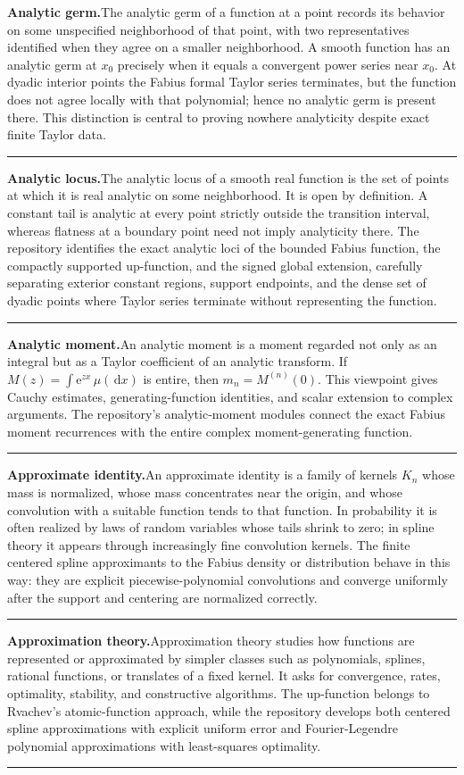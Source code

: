 \documentclass[11pt,oneside]{article}
\newcommand{\e}{\mathrm e}
\newcommand{\dd}{\,\mathrm d}
\newcommand{\glossaryentry}[3]{%
  \par\addvspace{0.95\baselineskip}%
  \phantomsection\hypertarget{gls:#1}{}%
  \noindent\textbf{\large #2.}\enspace #3\par
  \nopagebreak[2]\vspace{0.15\baselineskip}%
  \noindent\color{rulegray}\rule{\linewidth}{0.25pt}\color{black}%
}
\begin{document}
\glossaryentry{analytic-germ}{Analytic germ}{The analytic germ of a function at a point records its behavior on some unspecified neighborhood of that point, with two representatives identified when they agree on a smaller neighborhood. A smooth function has an analytic germ at \(x_0\) precisely when it equals a convergent power series near \(x_0\). At dyadic interior points the Fabius formal Taylor series terminates, but the function does not agree locally with that polynomial; hence no analytic germ is present there. This distinction is central to proving nowhere analyticity despite exact finite Taylor data.}
\glossaryentry{analytic-locus}{Analytic locus}{The analytic locus of a smooth real function is the set of points at which it is real analytic on some neighborhood. It is open by definition. A constant tail is analytic at every point strictly outside the transition interval, whereas flatness at a boundary point need not imply analyticity there. The repository identifies the exact analytic loci of the bounded Fabius function, the compactly supported up-function, and the signed global extension, carefully separating exterior constant regions, support endpoints, and the dense set of dyadic points where Taylor series terminate without representing the function.}
\glossaryentry{analytic-moment}{Analytic moment}{An analytic moment is a moment regarded not only as an integral but as a Taylor coefficient of an analytic transform. If \(M(z)=\int\e^{zx}\,\mu(\dd x)\) is entire, then \(m_n=M^{(n)}(0)\). This viewpoint gives Cauchy estimates, generating-function identities, and scalar extension to complex arguments. The repository's analytic-moment modules connect the exact Fabius moment recurrences with the entire complex moment-generating function.}
\glossaryentry{approximate-identity}{Approximate identity}{An approximate identity is a family of kernels \(K_n\) whose mass is normalized, whose mass concentrates near the origin, and whose convolution with a suitable function tends to that function. In probability it is often realized by laws of random variables whose tails shrink to zero; in spline theory it appears through increasingly fine convolution kernels. The finite centered spline approximants to the Fabius density or distribution behave in this way: they are explicit piecewise-polynomial convolutions and converge uniformly after the support and centering are normalized correctly.}
\glossaryentry{approximation-theory}{Approximation theory}{Approximation theory studies how functions are represented or approximated by simpler classes such as polynomials, splines, rational functions, or translates of a fixed kernel. It asks for convergence, rates, optimality, stability, and constructive algorithms. The up-function belongs to Rvachev's atomic-function approach, while the repository develops both centered spline approximations with explicit uniform error and Fourier-Legendre polynomial approximations with least-squares optimality.}
\end{document}
